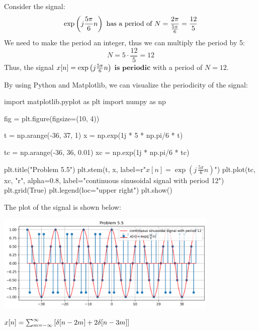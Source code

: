 \documentclass[a4paper, 10pt]{article}
\begin{document}
\begin{solution}
Consider the signal:
\[
\exp \left( j\frac{5\pi}{6}n \right) \text{ has a period of } N = \frac{2\pi}{\frac{5\pi}{6}} = \frac{12}{5}
\]
We need to make the period an integer, thus we can multiply the period by 5:
\[
    N = 5 \cdot \frac{12}{5} = 12
\]
Thus, the signal \( x[n] = \exp \left( j\frac{5\pi}{6}n \right) \) \( \boxed{\textbf{is periodic}} \) with a period of \( \boxed{N = 12} \).

\vspace{5mm}

By using Python and Matplotlib, we can visualize the periodicity of the signal:
\begin{codingbox}
import matplotlib.pyplot as plt
import numpy as np

fig = plt.figure(figsize=(10, 4))

t = np.arange(-36, 37, 1)
x = np.exp(1j * 5 * np.pi/6 * t)

tc = np.arange(-36, 36, 0.01)
xc = np.exp(1j * np.pi/6 * tc)

plt.title("Problem 5.5")
plt.stem(t, x, label=r"$x[n] = \exp(j\,\frac{5\pi}{6}n)$")
plt.plot(tc, xc, "r", alpha=0.8, label="continuous sinusoidal signal with period 12")
plt.grid(True)
plt.legend(loc="upper right")
plt.show()
\end{codingbox}

The plot of the signal is shown below:
\begin{center}
    \includegraphics[width=0.8\textwidth]{images/problem_5_5.png}
\end{center}
\end{solution}

\newpage

\begin{subproblems}[start=6]
    \item \( x[n] =  \sum_{m=-\infty}^{\infty} \left[ \delta[n-2m] + 2\delta[n-3m] \right] \)
\end{subproblems}
\end{document}
